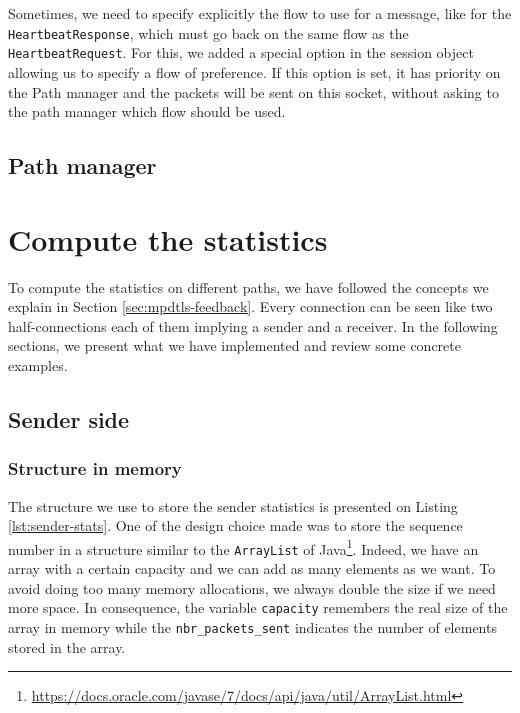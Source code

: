 Sometimes, we need to specify explicitly the flow to use for a message, like for the \texttt{HeartbeatResponse}, which must go back on the same flow as the \texttt{HeartbeatRequest}. For this, we added a special option in the session object allowing us to specify a flow of preference. If this option is set, it has priority on the Path manager and the packets will be sent on this socket, without asking to the path manager which flow should be used.

\subsection{Path manager}\label{ssec:pathmanager}


\section{Compute the statistics}\label{sec:impl-stats}

To compute the statistics on different paths, we have followed the concepts we explain in Section \ref{sec:mpdtls-feedback}. Every connection can be seen like two half-connections each of them implying a sender and a receiver. In the following sections, we present what we have implemented and review some concrete examples. 

\subsection{Sender side}

\subsubsection{Structure in memory}

The structure we use to store the sender statistics is presented on Listing \ref{lst:sender-stats}. One of the design choice made was to store the sequence number in a structure similar to the \texttt{ArrayList} of Java\footnote{\url{https://docs.oracle.com/javase/7/docs/api/java/util/ArrayList.html}}. Indeed, we have an array with a certain capacity and we can add as many elements as we want. To avoid doing too many memory allocations, we always double the size if we need more space. In consequence, the variable \texttt{capacity} remembers the real size of the array in memory while the \texttt{nbr\_packets\_sent} indicates the number of elements stored in the array.

